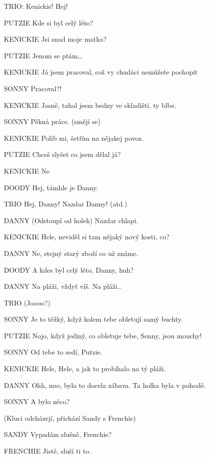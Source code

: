 \rep TRIO:        Kenickie! Hej!

\bye
PUTZIE        Kde si byl celý léto?

KENICKIE        Jsi snad moje matka?

PUTZIE        Jenom se ptám…

KENICKIE        Já jsem pracoval, což vy chudáci nemůžete pochopit

SONNY        Pracoval?!

KENICKIE                Jasně, tahal jsem bedny ve skladišti, ty blbe.

SONNY                Pěkná práce. (smějí se)

KENICKIE                Polib mi, šetřím na nějakej povoz.

PUTZIE                Chceš slyšet co jsem dělal já?

KENICKIE                 Ne

DOODY                Hej, támhle je Danny.

TRIO                Hej, Danny! Nazdar Danny! (atd.)

DANNY                (Odstoupí od holek) Nazdar chlapi. 

KENICKIE                Hele, neviděl si tam nějaký nový kosti, co?

DANNY                Ne, stejný starý zboží co už známe.

DOODY                A kdes byl celý léto, Danny, huh?

DANNY                Na pláži, vždyť víš. Na pláži..

TRIO                (Joooo?)

SONNY                Je to těžký, když kolem tebe obletují samý buchty.

PUTZIE                Nojo, když jediný, co obletuje tebe, Sonny, jsou mouchy!

SONNY                Od tebe to sedí, Putzie.

KENICKIE                Hele, Hele, a jak to probíhalo na tý pláži. 

DANNY                Ohh, noo, byla to docela zábava. Ta holka byla v pohodě.

SONNY                A bylo něco?

(Kluci odcházejí, přichází Sandy s Frenchie)





SANDY                Vypadám slušně, Frenchie?

FRENCHIE                Jistě, sluší ti to.

